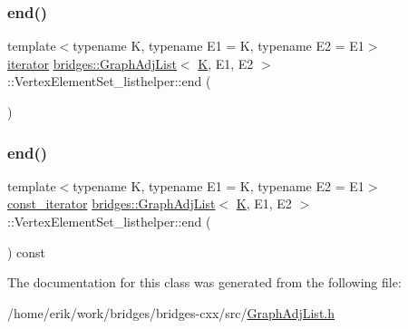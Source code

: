 \mbox{\label{classbridges_1_1_graph_adj_list_1_1_vertex_element_set__listhelper_aea97cdb87e88d3848e6451d1cfc62f2d}} 
\subsubsection{\texorpdfstring{end()}{end()}\hspace{0.1cm}{\footnotesize\ttfamily [1/2]}}
{\footnotesize\ttfamily template$<$typename K, typename E1 = K, typename E2 = E1$>$ \\
\hyperlink{classbridges_1_1_graph_adj_list_1_1_vertex_element_set__listhelper_1_1iterator}{iterator} \hyperlink{classbridges_1_1_graph_adj_list}{bridges\+::\+Graph\+Adj\+List}$<$ \hyperlink{namespacebridges_acfb0a4f7877d8f63de3e6862004c50edaa5f3c6a11b03839d46af9fb43c97c188}{K}, E1, E2 $>$\+::Vertex\+Element\+Set\+\_\+listhelper\+::end (\begin{DoxyParamCaption}{ }\end{DoxyParamCaption})\hspace{0.3cm}{\ttfamily [inline]}}

\mbox{\label{classbridges_1_1_graph_adj_list_1_1_vertex_element_set__listhelper_a7aff73080f67bec16219fd17d7f8bfd7}} 
\subsubsection{\texorpdfstring{end()}{end()}\hspace{0.1cm}{\footnotesize\ttfamily [2/2]}}
{\footnotesize\ttfamily template$<$typename K, typename E1 = K, typename E2 = E1$>$ \\
\hyperlink{classbridges_1_1_graph_adj_list_1_1_vertex_element_set__listhelper_1_1const__iterator}{const\+\_\+iterator} \hyperlink{classbridges_1_1_graph_adj_list}{bridges\+::\+Graph\+Adj\+List}$<$ \hyperlink{namespacebridges_acfb0a4f7877d8f63de3e6862004c50edaa5f3c6a11b03839d46af9fb43c97c188}{K}, E1, E2 $>$\+::Vertex\+Element\+Set\+\_\+listhelper\+::end (\begin{DoxyParamCaption}{ }\end{DoxyParamCaption}) const\hspace{0.3cm}{\ttfamily [inline]}}



The documentation for this class was generated from the following file\+:\begin{DoxyCompactItemize}
\item 
/home/erik/work/bridges/bridges-\/cxx/src/\hyperlink{_graph_adj_list_8h}{Graph\+Adj\+List.\+h}\end{DoxyCompactItemize}
